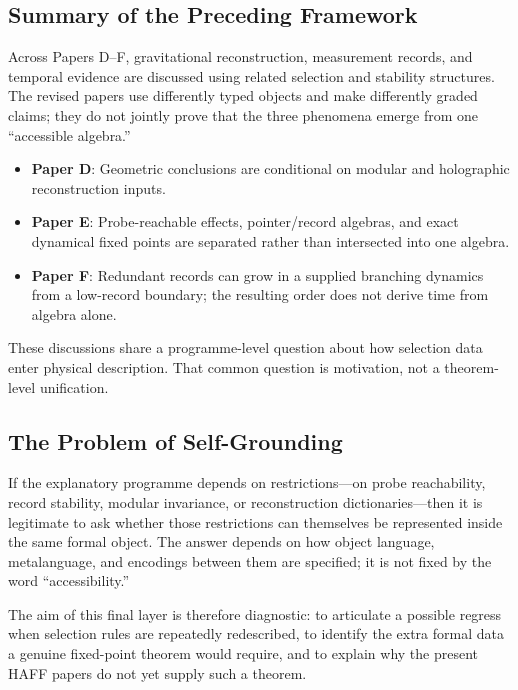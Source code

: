 \documentclass[12pt,a4paper,openany]{book}
\begin{document}
\subsection{Summary of the Preceding Framework}

Across Papers D--F, gravitational reconstruction, measurement records, and temporal evidence are discussed using related selection and stability structures.  The revised papers use differently typed objects and make differently graded claims; they do not jointly prove that the three phenomena emerge from one ``accessible algebra.''

\begin{itemize}
    \item \textbf{Paper D}: Geometric conclusions are conditional on modular and holographic reconstruction inputs.
    \item \textbf{Paper E}: Probe-reachable effects, pointer/record algebras, and exact dynamical fixed points are separated rather than intersected into one algebra.
    \item \textbf{Paper F}: Redundant records can grow in a supplied branching dynamics from a low-record boundary; the resulting order does not derive time from algebra alone.
\end{itemize}

These discussions share a programme-level question about how selection data enter physical description.  That common question is motivation, not a theorem-level unification.

\subsection{The Problem of Self-Grounding}

If the explanatory programme depends on restrictions---on probe reachability, record stability, modular invariance, or reconstruction dictionaries---then it is legitimate to ask whether those restrictions can themselves be represented inside the same formal object.  The answer depends on how object language, metalanguage, and encodings between them are specified; it is not fixed by the word ``accessibility.''

The aim of this final layer is therefore diagnostic: to articulate a possible regress when selection rules are repeatedly redescribed, to identify the extra formal data a genuine fixed-point theorem would require, and to explain why the present HAFF papers do not yet supply such a theorem.
\end{document}
